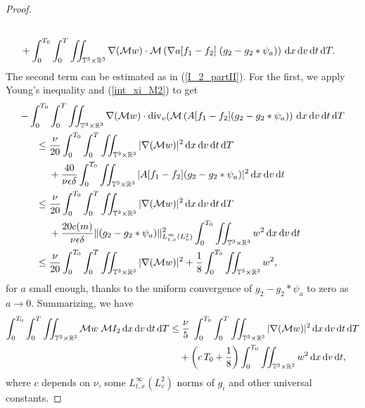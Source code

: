 \documentclass[11pt,american, reqno]{amsart}
\numberwithin{equation}{section}
\newcommand{\R}{\mathbb R}
\newcommand{\1}{\mathds{1}}
\newcommand{\dt}{\, {\rm d} t}
\newcommand{\dT}{\, {\rm d} T}
\newcommand{\dv}{\, {\rm d} v}
\newcommand{\dx}{\, {\rm d} x}
\newcommand{\vpran}[1]{\left(#1\right)}
\newcommand{\Eps}{\epsilon}
\newcommand{\T}{\mathbb{T}}
\numberwithin{equation}{section}
\begin{document}
\begin{proof}
\begin{align*}
\\
& +  \int_0^{T_0} \int_0^{T} \iint_{\T^3 \times \R^3}  \nabla(\mathcal{M} w) \cdot   \mathcal{M} \vpran{ \nabla a[f_1-f_2] \; ( g_2 -g_2 \ast \psi_a)}  \dx\dv\dt\dT. 
\end{align*}
The second term can be estimated as in (\ref{I_2_partII}). For the first, we apply Young's inequality and (\ref{int_xi_M2}) to get 
\begin{align*}
    - \int_0^{T_0}& \int_0^{T} \iint_{\T^3 \times \R^3}  \nabla(\mathcal{M} w) \cdot  \textrm{div}_v ( \mathcal{M} \left( A[f_1-f_2] ( g_2 -g_2 \ast \psi_a) \right) \dx\dv\dt\dT 
\\
    \le  \; & \frac{\nu}{20}\int_0^{T_0} \int_0^{T} \iint_{\T^3 \times \R^3}  |\nabla(\mathcal{M} w)|^2 \dx\dv\dt\dT  
\\
   &  + \frac{40}{\nu \Eps \delta } \int_0^{T_0} \iint_{\T^3 \times \R^3} | A[f_1-f_2] ( g_2 -g_2 \ast \psi_a)|^2 \dx\dv\dt 
\\
 \le  \; & \frac{\nu}{20}\int_0^{T_0} \int_0^{T} \iint_{\T^3 \times \R^3}  |\nabla(\mathcal{M} w)|^2 \dx\dv\dt\dT  
\\
   &  +  \frac{20 c(m)}{\nu \Eps \delta} \|  (g_2 -g_2 \ast \psi_a)\|^2_{L^\infty_{t,x}(L^2_v)} \int_0^{T_0} \iint_{\T^3 \times \R^3} w^2 \dx\dv\dt    
\\
    \le  \; & \frac{\nu}{20}\int_0^{T_0} \int_0^{T} \iint_{\T^3 \times \R^3}  |\nabla(\mathcal{M} w)|^2 %
+  \frac{1}{8 } \int_0^{T_0} \iint_{\T^3 \times \R^3} w^2, %
\end{align*}
for $a$ small enough, thanks to the uniform convergence of $g_2 -g_2 \ast \psi_a$ to zero as $a \to 0$.
Summarizing, we have 
\begin{align*}
    \int_0^{T_0}\int_0^{T} \iint_{\T^3 \times \R^3} \mathcal{M} w \; \mathcal{M}I_2 \dx\dv\dt\dT 
\le & \;  
\frac{ \nu}{5}\; \int_0^{T_0}\int_0^{T} \iint_{\T^3 \times \R^3}  |\nabla(\mathcal{M} w)|^2 \dx\dv\dt\dT 
\\
    &+ \left(c \, T_0+ \frac{1}{8}\right) \int_0^{T_0} \iint_{\T^3 \times \R^3}   w^2  \dx\dv\dt,
\end{align*}
where $c$ depends on $\nu$, some $L^\infty_{t,x}(L^2_v)$ norms of $g_i$ and other universal constants. 



\end{proof}
\end{document}
